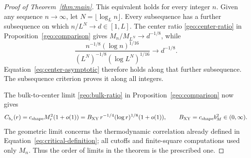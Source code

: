 \begin{proof}[Proof of Theorem~\ref{thm:main}]
This equivalent holds for every integer \(n\).  Given any sequence
\(n\to\infty\), let \(N=\lfloor\log_L n\rfloor\).  Every subsequence
has a further subsequence on which \(n/L^N\to d\in[1,L]\).
The center ratio \eqref{geo:center-ratio} in
Proposition~\ref{geo:comparison} gives
\(M_n/M_{L^N}\to d^{-1/8}\), while
\[
 \frac{n^{-1/8}(\log n)^{1/16}}
      {(L^N)^{-1/8}(\log L^N)^{1/16}}\longrightarrow d^{-1/8}.
\]
Equation~\eqref{eq:center-asymptotic} therefore holds along that
further subsequence.  The subsequence criterion proves it along
all integers.

The bulk-to-center limit \eqref{geo:bulk-ratio} in
Proposition~\ref{geo:comparison} now gives
\[
 C_{b_c}(r)
   =c_{\rm shape}M_r^2(1+o(1))
   =B_{\rm XY}\,r^{-1/4}(\log r)^{1/8}(1+o(1)),
 \qquad B_{\rm XY}=c_{\rm shape}b_M^2\in(0,\infty).
\]
The geometric limit concerns the thermodynamic correlation already
defined in Equation~\eqref{eq:critical-definition}; all cutoffs and
finite-square computations used only \(M_n\).  Thus the order of
limits in the theorem is the prescribed one.
\end{proof}
